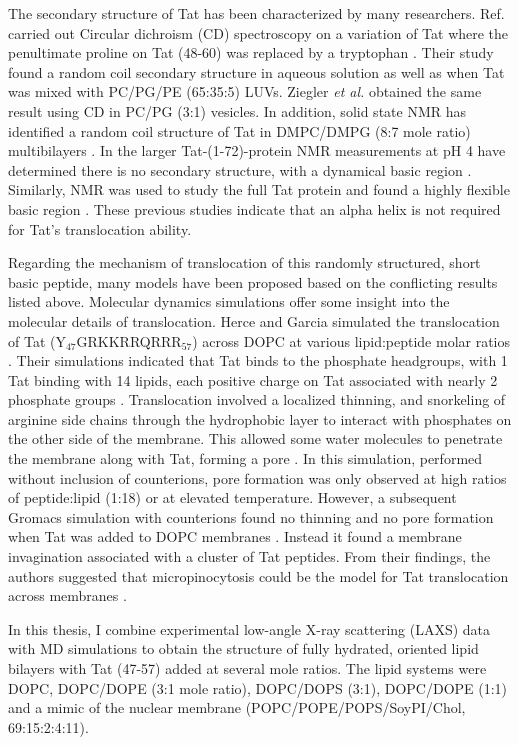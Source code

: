 The secondary structure of Tat has been characterized by many researchers. 
Ref.\cite{Thoren04} carried out Circular dichroism (CD) spectroscopy on a 
variation of Tat where the penultimate proline on Tat (48-60) was replaced by a
tryptophan \cite{Thoren04}. Their study found a random coil secondary structure 
in aqueous solution as well as when Tat was mixed with PC/PG/PE (65:35:5) LUVs. 
Ziegler \textit{et al.} \cite{Ziegler05} obtained the same result using CD in 
PC/PG (3:1) vesicles. In addition, solid state NMR has identified a random coil 
structure of Tat in DMPC/DMPG (8:7 mole ratio) multibilayers \cite{Su10}. 
In the larger Tat-(1-72)-protein NMR measurements at pH 4 have determined there 
is no secondary structure, with a dynamical basic region \cite{Shojania06}. 
Similarly, NMR was used to study the full Tat protein and found a highly 
flexible basic region \cite{Bayer95}. These previous studies indicate that 
an alpha helix is not required for Tat’s translocation ability. 

Regarding the mechanism of translocation of this randomly structured, short 
basic peptide, many models have been proposed based on the conflicting results 
listed above. Molecular dynamics simulations offer some insight into the 
molecular details of translocation. Herce and Garcia simulated the 
translocation of Tat (Y$_{47}$GRKKRRQRRR$_{57}$) across DOPC at various 
lipid:peptide molar ratios \cite{Herce07}. Their simulations indicated that Tat 
binds to the phosphate headgroups, with 1 Tat binding with 14 lipids, each 
positive charge on Tat associated with nearly 2 phosphate groups \cite{Herce07}. 
Translocation involved a localized thinning, and snorkeling of arginine side 
chains through the hydrophobic layer to interact with phosphates on
the other side of the membrane. This allowed some water molecules to penetrate 
the membrane along with Tat, forming a pore \cite{Herce07}. In this simulation, 
performed without inclusion of counterions, pore formation was only observed at 
high ratios of peptide:lipid (1:18) or at elevated temperature. However, a 
subsequent Gromacs simulation with counterions found no thinning and no pore 
formation when Tat was added to DOPC membranes \cite{Yesylevskyy09}. Instead it 
found a membrane invagination associated with a cluster of Tat peptides. From 
their findings, the authors suggested that micropinocytosis could be the model 
for Tat translocation across membranes \cite{Yesylevskyy09}. 

In this thesis, I combine experimental low-angle X-ray scattering (LAXS) 
data with MD simulations to obtain the structure of fully hydrated, oriented 
lipid bilayers with Tat (47-57) added at several mole ratios. The lipid systems 
were DOPC, DOPC/DOPE (3:1 mole ratio), DOPC/DOPS (3:1), DOPC/DOPE (1:1) and a 
mimic of the nuclear membrane (POPC/POPE/POPS/SoyPI/Chol, 69:15:2:4:11). 


